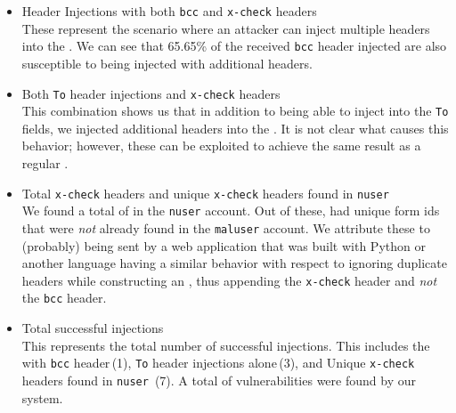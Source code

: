 

\begin{itemize}
	\item \Email Header Injections with both \texttt{bcc} and \texttt{x-check} headers\\
	  These represent the scenario where an attacker can inject multiple headers into the \emails. We can see that 65.65\% of the received \texttt{bcc} header injected \emails are also susceptible to being injected with additional headers.
	
	\item Both \texttt{To} header injections and \texttt{x-check} headers \\
	This combination shows us that in addition to being able to inject into the \texttt{To} fields, we injected additional headers into the \email. It is not clear what causes this behavior; however, these can be exploited to achieve the same result as a regular \ehi.
	
	\item Total \texttt{x-check} headers and unique \texttt{x-check} headers found in \texttt{nuser} \emails\\
		We found a total of \ehinuserxcheck \emails in the \texttt{nuser} account. Out of these, \ehiuniquenuserxcheck had unique form ids that were \emph{not} already found in the \texttt{maluser} account. We attribute these \emails to (probably) being sent by a web application that was built with Python or another language having a similar behavior with respect to ignoring duplicate headers while constructing an \email, thus appending the \texttt{x-check} header and \emph{not} the \texttt{bcc} header. 
	
	\item Total successful injections\\
	  This represents the total number of successful injections. This includes the \ehi with \texttt{bcc} header\,(1), \texttt{To} header injections alone\,(3), and Unique \texttt{x-check} headers found in \texttt{nuser} \emails\,(7). A total of \success vulnerabilities were found by our system.

	
\end{itemize}
